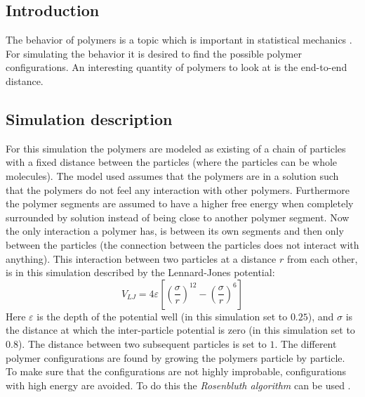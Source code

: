 \documentclass{article}
\begin{document}
\begin{multicols}{2}
\subsection*{Introduction}
The behavior of polymers is a topic which is important in statistical mechanics \cite{Jos}\cite{Paper}.  For simulating the behavior it is desired to find the possible polymer configurations. An interesting quantity of polymers to look at is the end-to-end distance.
\subsection*{Simulation description}
For this simulation the polymers are modeled as existing of a chain of particles with a fixed distance between the particles (where the particles can be whole molecules). The model used assumes that the polymers are in a solution such that the polymers do not feel any interaction with other polymers. Furthermore the polymer segments are assumed to have a higher free energy when completely surrounded by solution instead of being close to another polymer segment. Now the only interaction a polymer has, is between its own segments and then only between the particles (the connection between the particles does not interact with anything). This interaction between two particles at a distance $r$ from each other, is in this simulation described by the Lennard-Jones potential:
\begin{equation}
 V_{LJ}=4\varepsilon\left[\left(\frac{\sigma}{r}\right)^{ 12}-\left(\frac{\sigma}{r}\right)^{6}\right]
 \label{eq:LennardJones}
 \end{equation}
Here $\varepsilon$ is the depth of the potential well (in this simulation set to $0.25$), and $\sigma$ is the distance at which the inter-particle potential is zero (in this simulation set to $0.8$). The distance between two subsequent particles is set to $1$. The different polymer configurations are found by growing the polymers particle by particle. To make sure that the configurations are not highly improbable, configurations with high energy are avoided. To do this  the \emph{Rosenbluth algorithm} can be used \cite{Jos}. 

\end{multicols}
\end{document}
